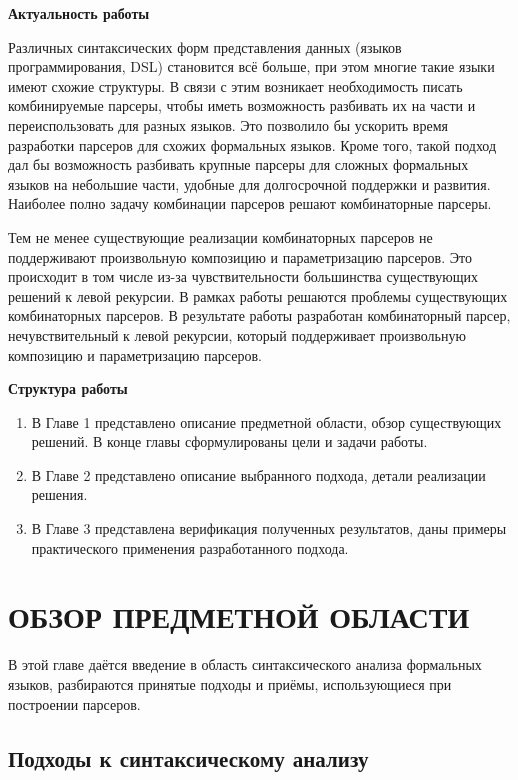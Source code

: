 \documentclass[times]{itmo-student-thesis}
\begin{document}
\tableofcontents

\startprefacepage
\textbf{Актуальность работы}

Различных синтаксических форм представления данных (языков программирования, DSL) становится всё больше, при этом
многие	такие языки имеют схожие структуры. В связи с этим возникает необходимость писать комбинируемые парсеры, чтобы
иметь возможность разбивать их на части и переиспользовать для разных языков. Это позволило бы ускорить время
разработки парсеров для схожих формальных языков. Кроме того, такой подход дал бы возможность разбивать крупные парсеры
для сложных формальных языков на небольшие части, удобные для долгосрочной поддержки и развития. Наиболее полно задачу
комбинации парсеров решают комбинаторные парсеры. 

Тем не менее существующие реализации комбинаторных парсеров не поддерживают произвольную композицию и параметризацию
парсеров. Это происходит в том числе из-за чувствительности большинства существующих решений к левой рекурсии. В рамках
работы решаются проблемы существующих комбинаторных парсеров. В результате работы разработан комбинаторный парсер,
нечувствительный к левой рекурсии, который поддерживает произвольную композицию и параметризацию парсеров.

\textbf{Структура работы}

\begin{enumerate}
    \item В Главе 1 представлено описание предметной области, обзор существующих решений. В конце главы сформулированы 
    цели и задачи работы.
    \item В Главе 2 представлено описание выбранного подхода, детали реализации решения.
    \item В Главе 3 представлена верификация полученных результатов, даны примеры практического применения 
    разработанного подхода.
\end{enumerate}

\chapter{ОБЗОР ПРЕДМЕТНОЙ ОБЛАСТИ}

В этой главе даётся введение в область синтаксического анализа формальных языков, разбираются принятые подходы и приёмы, 
использующиеся при построении парсеров.

\section{Подходы к синтаксическому анализу}\label{sec:parsing_approaches}
\end{document}
